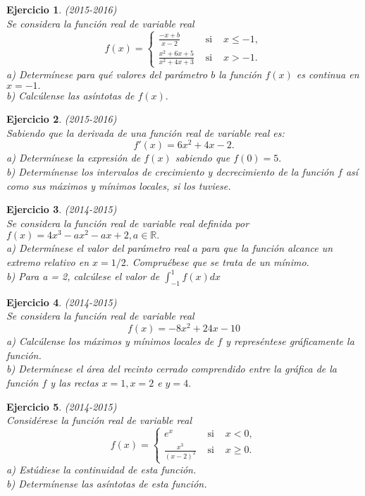 \documentclass[12pt, a4paper]{amsart}
\newtheorem{ejer}{Ejercicio}
\begin{document}
\begin{ejer}\em (2015-2016)\\
Se considera la función real de variable real
\[f(x)=\left \{ \begin{matrix}
\frac{-x+b}{x-2} & \text{ si } & x\leq -1,\\
\frac{x^2+6x+5}{x^2+4x+3} & \text{ si } & x>-1.
\end{matrix}\right.\]
a) Determínese para qué valores del parámetro $b$ la función $f(x)$ es continua en $x = -1.$\\
b) Calcúlense las asíntotas de $f(x).$
\end{ejer}

\begin{ejer}\em (2015-2016)\\
Sabiendo que la derivada de una función real de variable real es:
\[f'(x)=6x^2+4x-2.\]
a) Determínese la expresión de $f(x)$ sabiendo que $f (0) = 5.$\\
b) Determínense los intervalos de crecimiento y decrecimiento de la función $f$ así como sus máximos y mínimos locales, si los tuviese.
\end{ejer}

\begin{ejer}\em (2014-2015)\\
Se considera la función real de variable real definida por $f(x)=4x^3-ax^2-ax+2, a\in\mathbb{R}.$\\
a) Determínese el valor del parámetro real $a$ para que la función alcance un extremo relativo en $x = 1 / 2.$ Compruébese que se trata de un mínimo.\\
b) Para a = 2, calcúlese el valor de $\int_{-1}^1f(x)dx$
\end{ejer}

\begin{ejer}\em (2014-2015)\\
Se considera la función real de variable real
\[f(x)=-8x^2+24x-10\]
a) Calcúlense los máximos y mínimos locales de $f$ y represéntese gráficamente la función.\\
b) Determínese el área del recinto cerrado comprendido entre la gráfica de la función $f$ y las rectas $x = 1, x = 2$ e $y = 4.$
\end{ejer}

\begin{ejer}\em (2014-2015)\\
Considérese la función real de variable real
\[f(x)=\left \{ \begin{matrix}
e^x & \text{ si } & x<0,\\
\frac{x^3}{(x-2)^2} & \text{ si } & x\geq 0.
\end{matrix}\right.\]
a) Estúdiese la continuidad de esta función.\\
b) Determínense las asíntotas de esta función.
\end{ejer}
\end{document}
